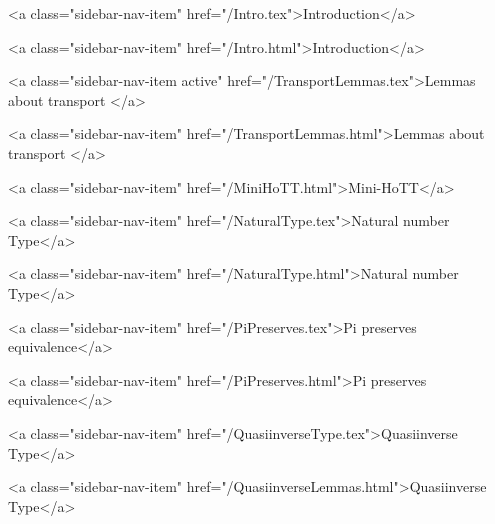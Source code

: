       
    
      
        
          <a class="sidebar-nav-item" href="/Intro.tex">Introduction</a>
        
      
    
      
        
          <a class="sidebar-nav-item" href="/Intro.html">Introduction</a>
        
      
    
      
        
          <a class="sidebar-nav-item active" href="/TransportLemmas.tex">Lemmas about transport </a>
        
      
    
      
        
          <a class="sidebar-nav-item" href="/TransportLemmas.html">Lemmas about transport </a>
        
      
    
      
        
          <a class="sidebar-nav-item" href="/MiniHoTT.html">Mini-HoTT</a>
        
      
    
      
        
          <a class="sidebar-nav-item" href="/NaturalType.tex">Natural number Type</a>
        
      
    
      
        
          <a class="sidebar-nav-item" href="/NaturalType.html">Natural number Type</a>
        
      
    
      
        
          <a class="sidebar-nav-item" href="/PiPreserves.tex">Pi preserves equivalence</a>
        
      
    
      
        
          <a class="sidebar-nav-item" href="/PiPreserves.html">Pi preserves equivalence</a>
        
      
    
      
        
          <a class="sidebar-nav-item" href="/QuasiinverseType.tex">Quasiinverse Type</a>
        
      
    
      
        
          <a class="sidebar-nav-item" href="/QuasiinverseLemmas.html">Quasiinverse Type</a>
        
